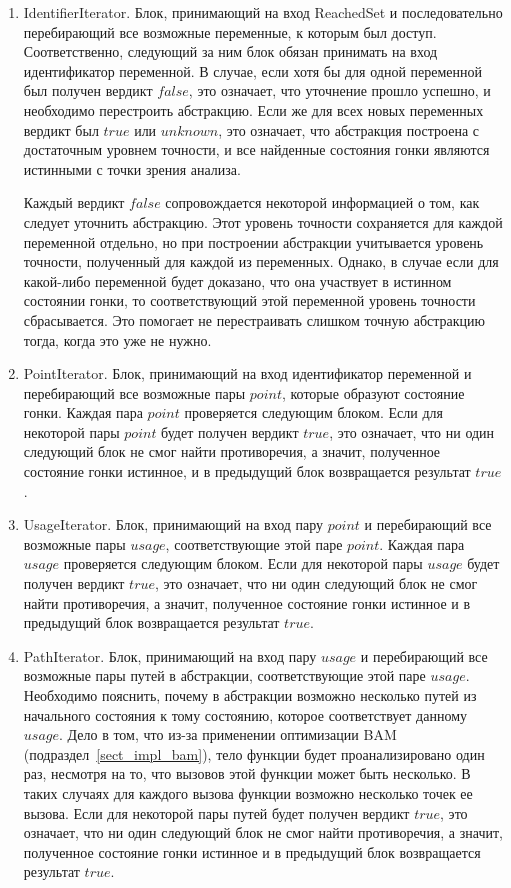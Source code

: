 \begin{enumerate}

\item IdentifierIterator. Блок, принимающий на вход ReachedSet и последовательно перебирающий все возможные переменные, к которым был доступ.
Соответственно, следующий за ним блок обязан принимать на вход идентификатор переменной.
В случае, если хотя бы для одной переменной был получен вердикт $false$, это означает, что уточнение прошло успешно, и необходимо перестроить абстракцию.
Если же для всех новых переменных вердикт был $true$ или $unknown$, это означает, что абстракция построена с достаточным уровнем точности, и все найденные состояния гонки являются истинными с точки зрения анализа.

Каждый вердикт $false$ сопровождается некоторой информацией о том, как следует уточнить абстракцию.
Этот уровень точности сохраняется для каждой переменной отдельно, но при построении абстракции учитывается уровень точности, полученный для каждой из переменных.
Однако, в случае если для  какой-либо переменной будет доказано, что она участвует в истинном состоянии гонки, то соответствующий этой переменной уровень точности сбрасывается.
Это помогает не перестраивать слишком точную абстракцию тогда, когда это уже не нужно.

\item PointIterator. Блок, принимающий на вход идентификатор переменной и перебирающий все возможные пары $point$, которые образуют состояние гонки.
Каждая пара $point$ проверяется следующим блоком. Если для некоторой пары $point$ будет получен вердикт $true$, это означает, что ни один следующий блок не смог найти противоречия, а значит, полученное состояние гонки истинное, и в предыдущий блок возвращается результат $true$. 

\item UsageIterator. Блок, принимающий на вход пару $point$ и перебирающий все возможные пары $usage$, соответствующие этой паре $point$.
Каждая пара $usage$ проверяется следующим блоком. Если для некоторой пары $usage$ будет получен вердикт $true$, это означает, что ни один следующий блок не смог найти противоречия, а значит, полученное состояние гонки истинное и в предыдущий блок возвращается результат $true$. 

\item PathIterator. Блок, принимающий на вход пару $usage$ и перебирающий все возможные пары путей в абстракции, соответствующие этой паре $usage$.
Необходимо пояснить, почему в абстракции возможно несколько путей из начального состояния к тому состоянию, которое соответствует данному $usage$.
Дело в том, что из-за применении оптимизации BAM (подраздел~\ref{sect_impl_bam}), тело функции будет проанализировано один раз, несмотря на то, что вызовов этой функции может быть несколько.
В таких случаях для каждого вызова функции возможно несколько точек ее вызова.
Если для некоторой пары путей будет получен вердикт $true$, это означает, что ни один следующий блок не смог найти противоречия, а значит, полученное состояние гонки истинное и в предыдущий блок возвращается результат $true$. 

\end{enumerate}

